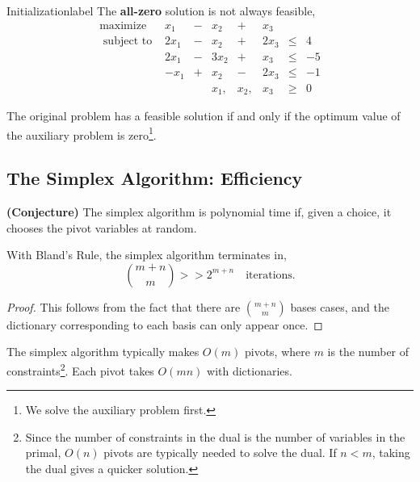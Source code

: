 	\begin{ex}{Initialization}{label}
		The \textbf{all-zero} solution is not always feasible,
		\[
		\begin{array}{cccccccc}
		\operatorname{maximize} & x_{1} & - & x_{2} & + & x_{3} & \\
		\text { subject to } & 2 x_{1} & - & x_{2} & + & 2 x_{3} & \leq & 4 \\
		& 2 x_{1} & - & 3 x_{2} & + & x_{3} & \leq & -5 \\
		& -x_{1} & + & x_{2} & - & 2 x_{3} & \leq & -1 \\
		& & & x_{1}, & x_{2}, & x_{3} & \geq & 0
		\end{array}
		\]
	\end{ex}

	\begin{rmk}
		The original problem has a feasible solution if and only if the optimum value of the auxiliary problem is zero\footnote{We solve the auxiliary problem first.}.
	\end{rmk}


	\subsection{The Simplex Algorithm: Efficiency}
	\begin{marginfigure}
		\textbf{(Conjecture)}
		The simplex algorithm is polynomial time if, given a choice, it chooses the pivot variables at random.
	\end{marginfigure}

	\begin{thm}
		With Bland's Rule, the simplex algorithm terminates in,
		\[\binom{m+n}{m} >> 2^{m+n} \quad \text{iterations.}\]
	\end{thm}

	\begin{proof}
		This follows from the fact that there are $\binom{m+n}{m}$ bases cases, and the dictionary corresponding to each basis can only appear once.
	\end{proof}

	\begin{rmk}
		The simplex algorithm typically makes $O(m)$ pivots, where $m$ is the number of constraints\footnote{Since the number of constraints in the dual is the number of variables in the primal, $O(n)$ pivots are typically needed to solve the dual. If $n < m$, taking the dual gives a quicker solution.}.  Each pivot takes $O(mn)$ with dictionaries.
	\end{rmk}

